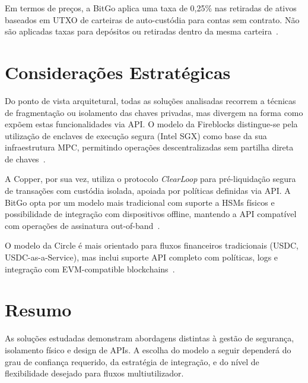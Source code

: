 Em termos de preços, a BitGo aplica uma taxa de 0,25\% nas retiradas de ativos baseados em UTXO de carteiras de auto-custódia para contas sem contrato. Não são aplicadas taxas para depósitos ou retiradas dentro da mesma carteira~\cite{bitgopricing2023}.

\section{Considerações Estratégicas}
Do ponto de vista arquitetural, todas as soluções analisadas recorrem a técnicas de fragmentação ou isolamento das chaves privadas, mas divergem na forma como expõem estas funcionalidades via API. O modelo da Fireblocks distingue-se pela utilização de enclaves de execução segura (Intel SGX) como base da sua infraestrutura MPC, permitindo operações descentralizadas sem partilha direta de chaves~\cite{fireblocks2023}.

A Copper, por sua vez, utiliza o protocolo \textit{ClearLoop} para pré-liquidação segura de transações com custódia isolada, apoiada por políticas definidas via API. A BitGo opta por um modelo mais tradicional com suporte a HSMs físicos e possibilidade de integração com dispositivos offline, mantendo a API compatível com operações de assinatura out-of-band~\cite{bitgo2023}.

O modelo da Circle é mais orientado para fluxos financeiros tradicionais (USDC, USDC-as-a-Service), mas inclui suporte API completo com políticas, logs e integração com EVM-compatible blockchains~\cite{circle2023}.

\section*{Resumo}
As soluções estudadas demonstram abordagens distintas à gestão de segurança, isolamento físico e design de APIs. A escolha do modelo a seguir dependerá do grau de confiança requerido, da estratégia de integração, e do nível de flexibilidade desejado para fluxos multiutilizador.
